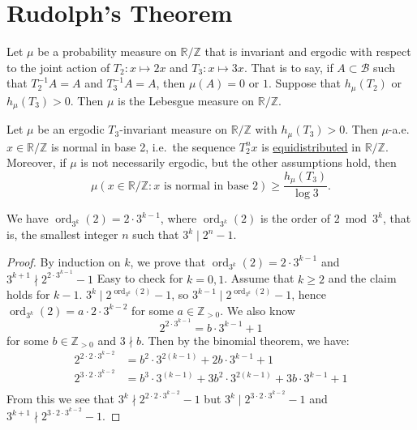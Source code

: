 \documentclass{article}
\DeclareMathOperator{\ord}{ord}
\begin{document}
\section{Rudolph's Theorem}
\begin{thm}
  Let $\mu$ be a probability measure on $\mathbb{R}/\mathbb{Z}$ that is invariant and ergodic with respect to the joint action of $T_2: x \mapsto 2x$ and $T_3: x \mapsto 3x$.
  That is to say, if $A \subset \mathcal{B}$ such that $T_2^{-1} A = A$ and $T_3^{-1} A = A$, then $\mu(A) = 0$ or $1$.
  Suppose that $h_\mu(T_2)$ or $h_\mu(T_3) > 0$.
  Then $\mu$ is the Lebesgue measure on $\mathbb{R}/\mathbb{Z}$.
\end{thm}
\begin{thm}[Host]
  Let $\mu$ be an ergodic $T_3$-invariant measure on $\mathbb{R}/\mathbb{Z}$ with $h_\mu(T_3) > 0$.
  Then $\mu$-a.e.\ $x \in \mathbb{R}/\mathbb{Z}$ is normal in base 2, i.e.\ the sequence $T_2^n x$ is \hyperlink{def:equid}{equidistributed} in $\mathbb{R}/\mathbb{Z}$.
  Moreover, if $\mu$ is not necessarily ergodic, but the other assumptions hold, then
  \begin{equation*}
    \mu(x \in \mathbb{R}/\mathbb{Z} : x \text{ is normal in base } 2) \geq \frac{h_\mu(T_3)}{\log 3}.
  \end{equation*}
\end{thm}
\begin{lemma}
  We have $\ord_{3^k}(2) = 2 \cdot 3^{k-1}$, where $\ord_{3^k}(2)$ is the order of $2 \bmod{3^k}$, that is, the smallest integer $n$ such that $3^k \mid 2^n - 1$.
\end{lemma}
\begin{proof}
  By induction on $k$, we prove that $\ord_{3^k}(2) = 2 \cdot 3^{k-1}$ and $3^{k+1} \nmid 2^{2 \cdot 3^{k-1}} - 1$
  Easy to check for $k=0,1$. Assume that $k \geq 2$ and the claim holds for $k-1$.
  $3^k \mid 2^{\ord_{3^k}(2)} - 1$, so $3^{k-1} \mid 2^{\ord_{3^k}(2)} - 1$, hence $\ord_{3^k}(2) = a \cdot 2 \cdot 3^{k-2}$ for some $a \in \mathbb{Z}_{>0}$.
  We also know
  \begin{equation*}
    2^{2 \cdot 3^{k-1}} = b \cdot 3^{k-1} + 1
  \end{equation*}
  for some $b \in \mathbb{Z}_{>0}$ and $3 \nmid b$.
  Then by the binomial theorem, we have:
  \begin{align*}
    2^{2 \cdot 2 \cdot 3^{k-2}} &= b^2 \cdot 3^{2(k-1)} + 2b \cdot 3^{k-1} + 1 \\
    2^{3 \cdot 2 \cdot 3^{k-2}} &= b^3 \cdot 3^{(k-1)} + 3b^2 \cdot 3^{2(k-1)}+ 3b \cdot 3^{k-1} + 1 \\
  \end{align*}
  From this we see that $3^k \nmid 2^{2 \cdot 2 \cdot 3^{k-2}} -1$ but $3^k \mid 2^{3 \cdot 2 \cdot 3^{k-2}}-1$ and $3^{k+1} \nmid 2^{3\cdot 2\cdot 3^{k-2}} -1$.
\end{proof}
\end{document}
